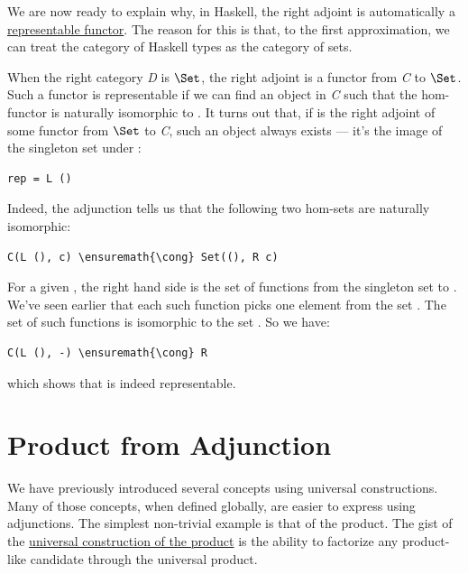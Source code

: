 We are now ready to explain why, in Haskell, the right adjoint is
automatically a \hyperref[representable-functors]{representable
functor}. The reason for this is that, to the first approximation, we
can treat the category of Haskell types as the category of sets.

When the right category \emph{D} is $\Set$, the right adjoint
 is a functor from \emph{C} to $\Set$. Such a functor is
representable if we can find an object  in \emph{C} such
that the hom-functor  is naturally isomorphic to
. It turns out that, if  is the right adjoint of
some functor  from $\Set$ to \emph{C}, such an object
always exists --- it's the image of the singleton set \code{()} under
:

\begin{Verbatim}[commandchars=\\\{\}]
rep = L ()
\end{Verbatim}
Indeed, the adjunction tells us that the following two hom-sets are
naturally isomorphic:

\begin{Verbatim}[commandchars=\\\{\}]
C(L (), c) \ensuremath{\cong} Set((), R c)
\end{Verbatim}
For a given , the right hand side is the set of functions from
the singleton set \code{()} to . We've seen earlier that
each such function picks one element from the set . The set
of such functions is isomorphic to the set . So we have:

\begin{Verbatim}[commandchars=\\\{\}]
C(L (), -) \ensuremath{\cong} R
\end{Verbatim}
which shows that  is indeed representable.

\section{Product from Adjunction}\label{product-from-adjunction}

We have previously introduced several concepts using universal
constructions. Many of those concepts, when defined globally, are easier
to express using adjunctions. The simplest non-trivial example is that
of the product. The gist of the \hyperref[products-and-coproducts]{universal
construction of the product} is the ability to factorize any
product-like candidate through the universal product.

